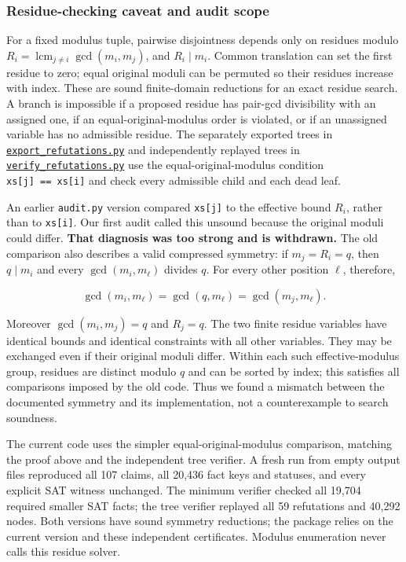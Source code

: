 \documentclass[11pt,a4paper]{article}
\begin{document}
\subsubsection{Residue-checking caveat and audit scope}\label{residue-checking-caveat-and-audit-scope}

For a fixed modulus tuple, pairwise disjointness depends only on residues modulo \(R_i=\operatorname{lcm}_{j\ne i}\gcd(m_i,m_j)\), and \(R_i\mid m_i\). Common translation can set the first residue to zero; equal original moduli can be permuted so their residues increase with index. These are sound finite-domain reductions for an exact residue search. A branch is impossible if a proposed residue has pair-gcd divisibility with an assigned one, if an equal-original-modulus order is violated, or if an unassigned variable has no admissible residue. The separately exported trees in \href{https://github.com/mpelteshki/climbing-to-the-frontier/blob/ed55f76eb8c558825bb629fd2cd8dbf46e5f1314/cagent/p4/audit/export_refutations.py}{\texttt{export\_refutations.py}} and independently replayed trees in \href{https://github.com/mpelteshki/climbing-to-the-frontier/blob/ed55f76eb8c558825bb629fd2cd8dbf46e5f1314/cagent/p4/audit/verify_refutations.py}{\texttt{verify\_refutations.py}} use the equal-original-modulus condition \texttt{xs{[}j{]}\ ==\ xs{[}i{]}} and check every admissible child and each dead leaf.

An earlier \texttt{audit.py} version compared \texttt{xs{[}j{]}} to the effective bound \(R_i\), rather than to \texttt{xs{[}i{]}}. Our first audit called this unsound because the original moduli could differ. \textbf{That diagnosis was too strong and is withdrawn.} The old comparison also describes a valid compressed symmetry: if \(m_j=R_i=q\), then \(q\mid m_i\) and every \(\gcd(m_i,m_\ell)\) divides \(q\). For every other position \(\ell\), therefore,

\[\gcd(m_i,m_\ell)=\gcd(q,m_\ell)=\gcd(m_j,m_\ell).\]

Moreover \(\gcd(m_i,m_j)=q\) and \(R_j=q\). The two finite residue variables have identical bounds and identical constraints with all other variables. They may be exchanged even if their original moduli differ. Within each such effective-modulus group, residues are distinct modulo \(q\) and can be sorted by index; this satisfies all comparisons imposed by the old code. Thus we found a mismatch between the documented symmetry and its implementation, not a counterexample to search soundness.

The current code uses the simpler equal-original-modulus comparison, matching the proof above and the independent tree verifier. A fresh run from empty output files reproduced all 107 claims, all 20,436 fact keys and statuses, and every explicit SAT witness unchanged. The minimum verifier checked all 19,704 required smaller SAT facts; the tree verifier replayed all 59 refutations and 40,292 nodes. Both versions have sound symmetry reductions; the package relies on the current version and these independent certificates. Modulus enumeration never calls this residue solver.
\end{document}
